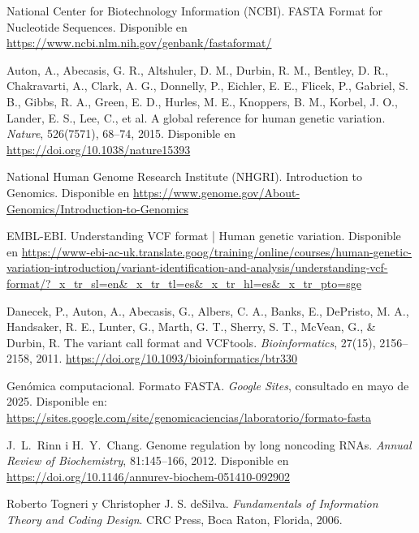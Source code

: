 \documentclass[11pt,spanish,listoffigures,listoftables]{tfgetsinf}
\begin{document}
\begin{thebibliography}{99}
   National Center for Biotechnology Information (NCBI).  
   \newblock FASTA Format for Nucleotide Sequences. 
   \newblock Disponible en 
   \newblock \url{https://www.ncbi.nlm.nih.gov/genbank/fastaformat/}
 
   Auton, A., Abecasis, G. R., Altshuler, D. M., Durbin, R. M., Bentley, D. R., Chakravarti, A., Clark, A. G., Donnelly, P., Eichler, E. E., Flicek, P., Gabriel, S. B., Gibbs, R. A., Green, E. D., Hurles, M. E., Knoppers, B. M., Korbel, J. O., Lander, E. S., Lee, C., et al.  
   \newblock A global reference for human genetic variation.  
   \newblock \textit{Nature}, 526(7571), 68–74, 2015.  
   \newblock Disponible en 
   \newblock \url{https://doi.org/10.1038/nature15393}
   
   National Human Genome Research Institute (NHGRI).  
   \newblock Introduction to Genomics.  
   \newblock Disponible en  
   \newblock \url{https://www.genome.gov/About-Genomics/Introduction-to-Genomics}


   EMBL-EBI.  
   \newblock Understanding VCF format | Human genetic variation.  
   \newblock Disponible en 
   \newblock \url{https://www-ebi-ac-uk.translate.goog/training/online/courses/human-genetic-variation-introduction/variant-identification-and-analysis/understanding-vcf-format/?_x_tr_sl=en&_x_tr_tl=es&_x_tr_hl=es&_x_tr_pto=sge}
   
   Danecek, P., Auton, A., Abecasis, G., Albers, C. A., Banks, E., DePristo, M. A., Handsaker, R. E., Lunter, G., Marth, G. T., Sherry, S. T., McVean, G., \& Durbin, R.  
   \newblock The variant call format and VCFtools.  
   \newblock \textit{Bioinformatics}, 27(15), 2156–2158, 2011.  
   \newblock \url{https://doi.org/10.1093/bioinformatics/btr330}

   Genómica computacional.  
   \newblock Formato FASTA.  
   \newblock \textit{Google Sites}, consultado en mayo de 2025.  
   \newblock Disponible en: \url{https://sites.google.com/site/genomicaciencias/laboratorio/formato-fasta}

   J.~L.~Rinn i H.~Y.~Chang.
   \newblock Genome regulation by long noncoding RNAs.
   \newblock \textit{Annual Review of Biochemistry}, 81:145--166, 2012.
   \newblock Disponible en
   \newblock \url{https://doi.org/10.1146/annurev-biochem-051410-092902}

   Roberto Togneri y Christopher J. S. deSilva.  
   \newblock \textit{Fundamentals of Information Theory and Coding Design}.  
   \newblock CRC Press, Boca Raton, Florida, 2006.
   

\end{thebibliography}
\cleardoublepage
\end{document}
